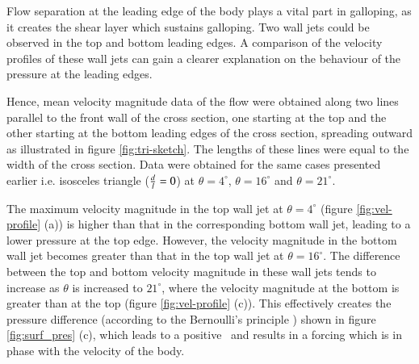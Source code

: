 Flow separation at the leading edge of the body plays a vital part in galloping, as it creates the shear layer which sustains galloping. Two wall jets could be observed in the top and bottom leading edges. A comparison of the velocity profiles of these wall jets can gain a clearer explanation on the behaviour of the pressure at the leading edges.   



Hence, mean velocity magnitude data of the flow were obtained along two lines parallel to the front wall of the cross section, one starting at the top and the other starting at the bottom leading edges of the cross section, spreading outward as illustrated in figure \ref{fig:tri-sketch}. The lengths of these lines were equal to the width of the cross section. Data were obtained for the same cases presented earlier i.e. isosceles triangle ($\frac{d}{l}=0$) at $\theta=4^{\circ}$, $\theta=16^{\circ}$ and $\theta=21^{\circ}$.  







The maximum velocity magnitude in the top wall jet at $\theta= 4^{\circ}$ (figure \ref{fig:vel-profile} (a)) is higher than that in the corresponding bottom wall jet, leading to a lower pressure at the top edge. However, the velocity magnitude in the bottom wall jet becomes greater than that in the top wall jet at $\theta=16^{\circ}$. The difference between the top and bottom velocity magnitude in these wall jets tends to increase as $\theta$ is increased to $21^{\circ}$, where the velocity magnitude at the bottom is greater than at the top (figure \ref{fig:vel-profile} (c)). This effectively creates the pressure difference (according to the Bernoulli's principle ) shown in figure \ref{fig:surf_pres} (c), which leads to a positive \cy\ and results in a forcing which is in phase with the velocity of the body. 








 
 

 
 

 
 
 
 
 
 
 
 
 
 
 